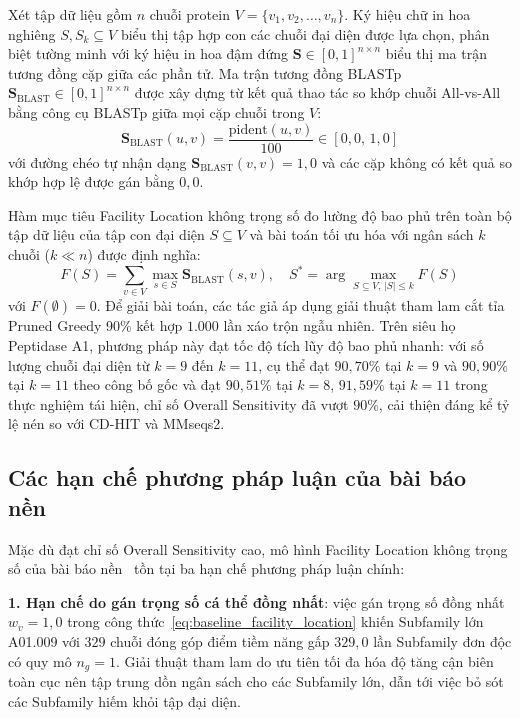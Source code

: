 Xét tập dữ liệu gồm $n$ chuỗi protein $V = \{v_1, v_2, \dots, v_n\}$. Ký hiệu chữ in hoa nghiêng $S, S_k \subseteq V$ biểu thị tập hợp con các chuỗi đại diện được lựa chọn, phân biệt tường minh với ký hiệu in hoa đậm đứng $\mathbf{S} \in [0, 1]^{n \times n}$ biểu thị ma trận tương đồng cặp giữa các phần tử. Ma trận tương đồng BLASTp $\mathbf{S}_{\text{BLAST}} \in [0, 1]^{n \times n}$ được xây dựng từ kết quả thao tác so khớp chuỗi All-vs-All bằng công cụ BLASTp giữa mọi cặp chuỗi trong $V$:
\begin{equation}
\label{eq:blast_similarity_def}
\mathbf{S}_{\text{BLAST}}(u, v) = \frac{\text{pident}(u, v)}{100} \in [0{,}0, \, 1{,}0]
\end{equation}
với đường chéo tự nhận dạng $\mathbf{S}_{\text{BLAST}}(v, v) = 1{,}0$ và các cặp không có kết quả so khớp hợp lệ được gán bằng $0{,}0$.

Hàm mục tiêu Facility Location không trọng số đo lường độ bao phủ trên toàn bộ tập dữ liệu của tập con đại diện $S \subseteq V$ và bài toán tối ưu hóa với ngân sách $k$ chuỗi ($k \ll n$) được định nghĩa:
\begin{equation}
\label{eq:baseline_facility_location}
F(S) = \sum_{v \in V} \max_{s \in S} \mathbf{S}_{\text{BLAST}}(s, v), \quad S^* = \arg\max_{S \subseteq V, \, |S| \le k} F(S)
\end{equation}
với $F(\emptyset) = 0$. Để giải bài toán, các tác giả áp dụng giải thuật tham lam cắt tỉa Pruned Greedy 90\% kết hợp $1.000$ lần xáo trộn ngẫu nhiên. Trên siêu họ Peptidase A1, phương pháp này đạt tốc độ tích lũy độ bao phủ nhanh: với số lượng chuỗi đại diện từ $k = 9$ đến $k = 11$, cụ thể đạt $90{,}70\%$ tại $k = 9$ và $90{,}90\%$ tại $k = 11$ theo công bố gốc và đạt $90{,}51\%$ tại $k = 8$, $91{,}59\%$ tại $k = 11$ trong thực nghiệm tái hiện, chỉ số Overall Sensitivity đã vượt $90\%$, cải thiện đáng kể tỷ lệ nén so với CD-HIT và MMseqs2.

\subsection{Các hạn chế phương pháp luận của bài báo nền}
\label{subsec:baseline_limitations}

Mặc dù đạt chỉ số Overall Sensitivity cao, mô hình Facility Location không trọng số của bài báo nền~\cite{nguyen2025} tồn tại ba hạn chế phương pháp luận chính:

\textbf{1. Hạn chế do gán trọng số cá thể đồng nhất}: việc gán trọng số đồng nhất $w_v = 1{,}0$ trong công thức~\eqref{eq:baseline_facility_location} khiến Subfamily lớn A01.009 với $329$ chuỗi đóng góp điểm tiềm năng gấp $329{,}0$ lần Subfamily đơn độc có quy mô $n_g = 1$. Giải thuật tham lam do ưu tiên tối đa hóa độ tăng cận biên toàn cục nên tập trung dồn ngân sách cho các Subfamily lớn, dẫn tới việc bỏ sót các Subfamily hiếm khỏi tập đại diện.

